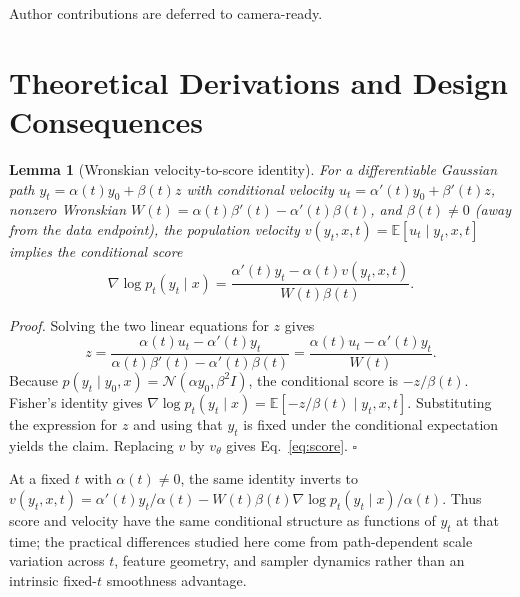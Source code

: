 \documentclass{tpm2026}
\newcommand{\E}{\mathbb{E}}
\newcommand{\Norm}{\mathcal{N}}
\newtheorem{lemma}{Lemma}
\begin{document}
\begin{contributions}
Author contributions are deferred to camera-ready.
\end{contributions}



\appendix
\onecolumn

\section{Theoretical Derivations and Design Consequences}\label{app:theory}

\begin{lemma}[Wronskian velocity-to-score identity]\label{lem:wronskian-score}
For a differentiable Gaussian path $y_t=\alpha(t)y_0+\beta(t)z$ with conditional velocity $u_t=\alpha'(t)y_0+\beta'(t)z$, nonzero Wronskian $W(t)=\alpha(t)\beta'(t)-\alpha'(t)\beta(t)$, and $\beta(t)\neq0$ (away from the data endpoint), the population velocity $v(y_t,x,t)=\E[u_t\mid y_t,x,t]$ implies the conditional score
\[
\nabla \log p_t(y_t\mid x)=\frac{\alpha'(t)y_t-\alpha(t)v(y_t,x,t)}{W(t)\beta(t)}.
\]
\end{lemma}
\emph{Proof.} Solving the two linear equations for $z$ gives
\[
z=\frac{\alpha(t)u_t-\alpha'(t)y_t}{\alpha(t)\beta'(t)-\alpha'(t)\beta(t)}
  =\frac{\alpha(t)u_t-\alpha'(t)y_t}{W(t)}.
\]
Because $p(y_t\mid y_0,x)=\Norm(\alpha y_0,\beta^2 I)$, the conditional score is $-z/\beta(t)$. Fisher's identity gives $\nabla\log p_t(y_t\mid x)=\E[-z/\beta(t)\mid y_t,x,t]$. Substituting the expression for $z$ and using that $y_t$ is fixed under the conditional expectation yields the claim. Replacing $v$ by $v_\theta$ gives Eq.~\eqref{eq:score}. \hfill$\square$

At a fixed $t$ with $\alpha(t)\neq0$, the same identity inverts to $v(y_t,x,t)=\alpha'(t)y_t/\alpha(t)-W(t)\beta(t)\nabla\log p_t(y_t\mid x)/\alpha(t)$. Thus score and velocity have the same conditional structure as functions of $y_t$ at that time; the practical differences studied here come from path-dependent scale variation across $t$, feature geometry, and sampler dynamics rather than an intrinsic fixed-$t$ smoothness advantage.
\end{document}
